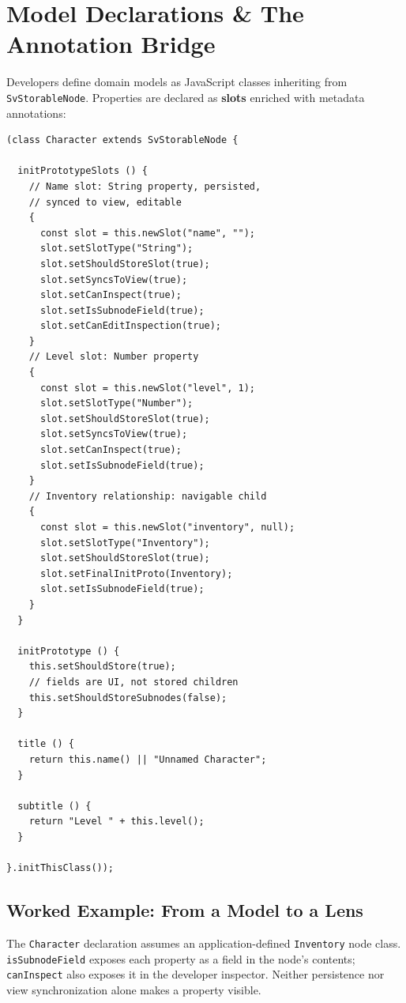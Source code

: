 \documentclass[sigplan,review,anonymous,10pt]{acmart}
\begin{document}
\section{Model Declarations \& The Annotation Bridge}
\label{sec:annotation-bridge}

Developers define domain models as JavaScript classes inheriting from \texttt{SvStorableNode}. Properties are declared as \textbf{slots} enriched with metadata annotations:

\begin{small}
\begin{verbatim}
(class Character extends SvStorableNode {

  initPrototypeSlots () {
    // Name slot: String property, persisted,
    // synced to view, editable
    {
      const slot = this.newSlot("name", "");
      slot.setSlotType("String");
      slot.setShouldStoreSlot(true);
      slot.setSyncsToView(true);
      slot.setCanInspect(true);
      slot.setIsSubnodeField(true);
      slot.setCanEditInspection(true);
    }
    // Level slot: Number property
    {
      const slot = this.newSlot("level", 1);
      slot.setSlotType("Number");
      slot.setShouldStoreSlot(true);
      slot.setSyncsToView(true);
      slot.setCanInspect(true);
      slot.setIsSubnodeField(true);
    }
    // Inventory relationship: navigable child
    {
      const slot = this.newSlot("inventory", null);
      slot.setSlotType("Inventory");
      slot.setShouldStoreSlot(true);
      slot.setFinalInitProto(Inventory);
      slot.setIsSubnodeField(true);
    }
  }

  initPrototype () {
    this.setShouldStore(true);
    // fields are UI, not stored children
    this.setShouldStoreSubnodes(false);
  }

  title () {
    return this.name() || "Unnamed Character";
  }

  subtitle () {
    return "Level " + this.level();
  }

}.initThisClass());
\end{verbatim}
\end{small}

\subsection{Worked Example: From a Model to a Lens}
\label{sec:worked-example}

The \texttt{Character} declaration assumes an application-defined \texttt{Inventory} node class. \texttt{isSubnodeField} exposes each property as a field in the node's contents; \texttt{canInspect} also exposes it in the developer inspector. Neither persistence nor view synchronization alone makes a property visible.
\end{document}
